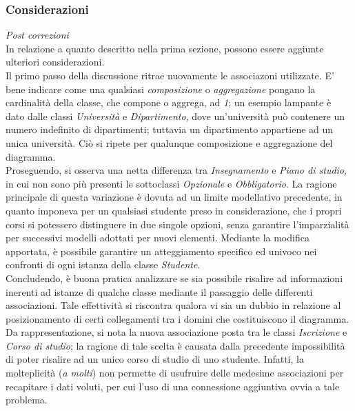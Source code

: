 \documentclass{article}
\begin{document}
\subsubsection*{Considerazioni}
\large
\textit{Post correzioni}\\
In relazione a quanto descritto nella prima sezione, possono essere aggiunte ulteriori considerazioni.\vspace*{14pt}\\
Il primo passo della discussione ritrae nuovamente le associazoni utilizzate. E' bene indicare come una qualsiasi \textit{composizione} o \textit{aggregazione} pongano la cardinalità della classe, che compone o aggrega, ad \textit{1}; un esempio lampante è dato dalle classi \textit{Università} e \textit{Dipartimento}, dove un'università può contenere un numero indefinito di dipartimenti; tuttavia un dipartimento appartiene ad un unica università. Ciò si ripete per qualunque composizione e aggregazione del diagramma.\vspace*{14pt}\\
Proseguendo, si osserva una netta differenza tra \textit{Insegnamento} e \textit{Piano di studio}, in cui non sono più presenti le sottoclassi \textit{Opzionale} e \textit{Obbligatorio}. La ragione principale di questa variazione è dovuta ad un limite modellativo precedente, in quanto imponeva per un qualsiasi studente preso in considerazione, che i propri corsi si potessero distinguere in due singole opzioni, senza garantire l'imparzialità per successivi modelli adottati per nuovi elementi. Mediante la modifica apportata, è possibile garantire un atteggiamento specifico ed univoco nei confronti di ogni istanza della classe \textit{Studente}.\vspace*{14pt}\\
Concludendo, è buona pratica analizzare se sia possibile risalire ad informazioni inerenti ad istanze di qualche classe mediante il passaggio delle differenti associazioni. Tale effettività si riscontra qualora vi sia un dubbio in relazione al posizionamento di certi collegamenti tra i domini che costituiscono il diagramma. Da rappresentazione, si nota la nuova associazione posta tra le classi \textit{Iscrizione} e \textit{Corso di studio}; la ragione di tale scelta è causata dalla precedente impossibilità di poter risalire ad un unico corso di studio di uno studente. Infatti, la molteplicità (\textit{a molti}) non permette di usufruire delle medesime associazioni per recapitare i dati voluti, per cui l'uso di una connessione aggiuntiva ovvia a tale problema.
\end{document}
